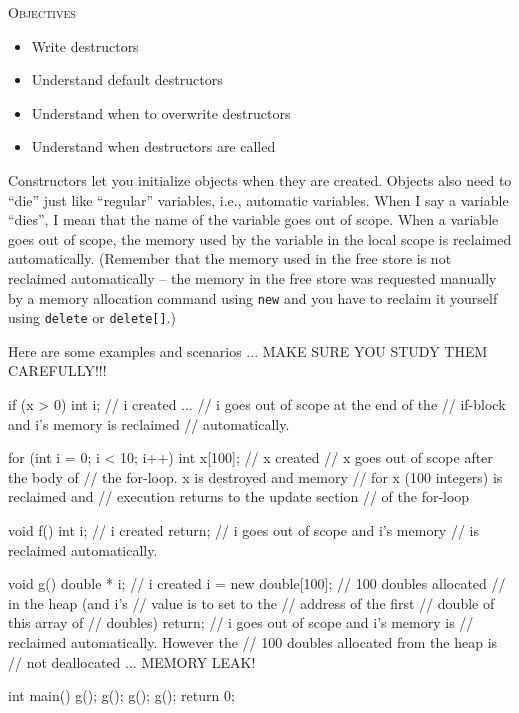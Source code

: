 \newpage{}

\textsc{Objectives}
\begin{itemize}
\item Write destructors
\item Understand default destructors
\item Understand when to overwrite destructors
\item Understand when destructors are called
\end{itemize}


\newpage{}

Constructors let you initialize objects when they are created. Objects
also need to ``die'' just like ``regular'' variables, i.e., automatic
variables. When I say a variable ``dies'', I mean that the name of the
variable goes out of scope. When a variable goes out of scope, the
memory used by the variable in the local scope is reclaimed
automatically. (Remember that the memory used in the free store is not
reclaimed automatically -- the memory in the free store was requested
manually by a memory allocation command using \texttt{new} and you have to
reclaim it yourself using \texttt{delete} or \texttt{delete[]}.)

Here are some examples and scenarios ... MAKE SURE YOU STUDY THEM
CAREFULLY!!!

\begin{consolethree}[escapeinside=||]
if (x > 0)
{
    int i; // i created
    ...
} // i goes out of scope at the end of the
  // if-block and i's memory is reclaimed
  // automatically.
\end{consolethree}

\begin{consolethree}[escapeinside=||]
for (int i = 0; i < 10; i++)
{
    int x[100]; // x created
} // x goes out of scope after the body of
  // the for-loop. x is destroyed and memory
  // for x (100 integers) is reclaimed and
  // execution returns to the update section
  // of the for-loop
\end{consolethree}

\begin{consolethree}[escapeinside=||]
void f()
{
    int i; // i created
    return; // i goes out of scope and i's memory
            // is reclaimed automatically.
}
\end{consolethree}

\begin{consolethree}[escapeinside=||]
void g()
{
    double * i; // i created
    i = new double[100]; // 100 doubles allocated
                         // in the heap (and i's
                         // value is to set to the
                         // address of the first
                         // double of this array of
                         // doubles)
    return; // i goes out of scope and i's memory is
            // reclaimed automatically. However the
            // 100 doubles allocated from the heap is
            // not deallocated ... MEMORY LEAK!
}

int main()
{
    g();
    g();
    g();
    g();
    return 0;
}
\end{consolethree}

